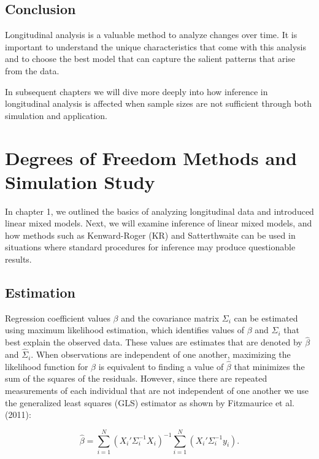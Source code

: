 \documentclass[12pt, twoside]{amherstthesis}
\begin{document}
\hypertarget{conclusion}{%
\section{Conclusion}\label{conclusion}}

Longitudinal analysis is a valuable method to analyze changes over time. It is important to understand the unique characteristics that come with this analysis and to choose the best model that can capture the salient patterns that arise from the data.

In subsequent chapters we will dive more deeply into how inference in longitudinal analysis is affected when sample sizes are not sufficient through both simulation and application.

\hypertarget{rmd-basics}{%
\chapter{Degrees of Freedom Methods and Simulation Study}\label{rmd-basics}}

In chapter 1, we outlined the basics of analyzing longitudinal data and introduced linear mixed models. Next, we will examine inference of linear mixed models, and how methods such as Kenward-Roger (KR) and Satterthwaite can be used in situations where standard procedures for inference may produce questionable results.

\hypertarget{estimation}{%
\section{Estimation}\label{estimation}}

Regression coefficient values \(\beta\) and the covariance matrix \(\Sigma_i\) can be estimated using maximum likelihood estimation, which identifies values of \(\beta\) and \(\Sigma_i\) that best explain the observed data. These values are estimates that are denoted by \(\hat\beta\) and \(\hat\Sigma_i.\) When observations are independent of one another, maximizing the likelihood function for \(\beta\) is equivalent to finding a value of \(\hat\beta\) that minimizes the sum of the squares of the residuals. However, since there are repeated measurements of each individual that are not independent of one another we use the generalized least squares (GLS) estimator as shown by Fitzmaurice et al. (2011):

\[\hat\beta = \sum_{i=1}^N(X_i'\Sigma^{-1}_iX_i)^{-1}\sum_{i=1}^N(X_i'\Sigma^{-1}_iy_i).\]
\end{document}
